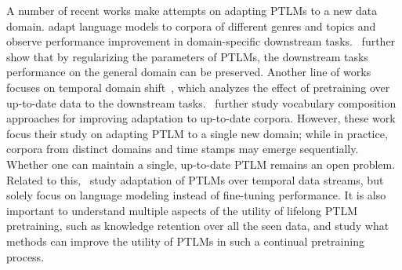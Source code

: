 


A number of recent works make attempts on adapting PTLMs to a new data domain.
\citet{Gururangan2020DontSP, Yao2021AdaptandDistillDS} adapt language models to corpora of different genres and topics
and observe performance improvement in domain-specific downstream tasks.~\citet{Arumae2020AnEI} further show that by regularizing the parameters of PTLMs, the downstream tasks performance on the general domain can be preserved. Another line of works focuses on temporal domain shift~\cite{Hombaiah2021DynamicLM}, which analyzes the effect of pretraining over up-to-date data to the downstream tasks.~\citet{Rttger2021TemporalAO} further study vocabulary composition approaches for improving adaptation to up-to-date corpora.
However, these work focus their study on adapting PTLM to a single new domain; while in practice, corpora from distinct domains and time stamps may emerge sequentially. 
Whether one can maintain a single, up-to-date PTLM remains an open problem. 
Related to this,~\citet{Lazaridou2021PitfallsOS} study adaptation of PTLMs over temporal data streams, but solely focus on language modeling instead of fine-tuning performance. %
It is also important to understand multiple aspects of the utility of lifelong PTLM pretraining, such as knowledge retention over all the seen data, and study what methods can improve the utility of PTLMs in such a continual pretraining process.



